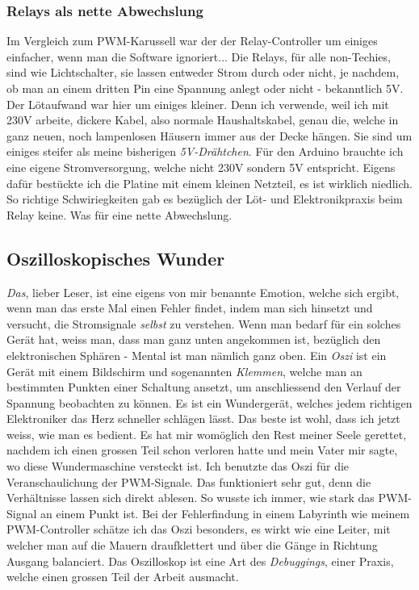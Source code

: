 \documentclass[12pt,titlepage,a4paper]{article}
\begin{document}
\subsubsection{Relays als nette Abwechslung}
Im Vergleich zum PWM-Karussell war der der Relay-Controller um einiges einfacher, wenn man die Software ignoriert... Die Relays, für alle non-Techies, sind wie Lichtschalter, sie lassen entweder Strom durch oder nicht, je nachdem, ob man an einem dritten Pin eine Spannung anlegt oder nicht - bekanntlich 5V. Der Lötaufwand war hier um einiges kleiner. Denn ich verwende, weil ich mit 230V arbeite, dickere Kabel, also normale Haushaltskabel, genau die, welche in ganz neuen, noch lampenlosen Häusern immer aus der Decke hängen. Sie sind um einiges steifer als meine bisherigen \textit{5V-Drähtchen}. Für den Arduino brauchte ich eine eigene Stromversorgung, welche nicht 230V sondern 5V entspricht. Eigens dafür bestückte ich die Platine mit einem kleinen Netzteil, es ist wirklich niedlich. So richtige Schwiriegkeiten gab es bezüglich der Löt- und Elektronikpraxis beim Relay keine. Was für eine nette Abwechslung.


\subsection{Oszilloskopisches Wunder}
\textit{Das}, lieber Leser, ist eine eigens von mir benannte Emotion, welche sich ergibt, wenn man das erste Mal einen Fehler findet, indem man sich hinsetzt und versucht, die Stromsignale \textit{selbst} zu verstehen. Wenn man bedarf für ein solches Gerät hat, weiss man, dass man ganz unten angekommen ist, bezüglich den elektronischen Sphären - Mental ist man nämlich ganz oben. Ein \textit{Oszi} ist ein Gerät mit einem Bildschirm und sogenannten \textit{Klemmen}, welche man an bestimmten Punkten einer Schaltung ansetzt, um anschliessend den Verlauf der Spannung beobachten zu können. Es ist ein Wundergerät, welches jedem richtigen Elektroniker das Herz schneller schlägen lässt. Das beste ist wohl, dass ich jetzt weiss, wie man es bedient. Es hat mir womöglich den Rest meiner Seele gerettet, nachdem ich einen grossen Teil schon verloren hatte und mein Vater mir sagte, wo diese Wundermaschine versteckt ist. Ich benutzte das Oszi  für die Veranschaulichung der PWM-Signale. Das funktioniert sehr gut, denn die Verhältnisse lassen sich direkt ablesen. So wusste ich immer, wie stark das PWM-Signal an einem Punkt ist. Bei der Fehlerfindung in einem Labyrinth wie meinem PWM-Controller schätze ich das Oszi besonders, es wirkt wie eine Leiter, mit welcher man auf die Mauern draufklettert und über die Gänge in Richtung Ausgang balanciert. Das Oszilloskop ist eine Art des \textit{Debuggings}, einer Praxis, welche einen grossen Teil der Arbeit ausmacht.
\end{document}
